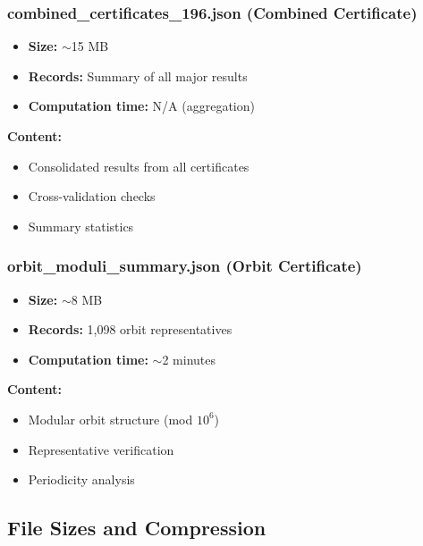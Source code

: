 \documentclass[11pt,a4paper]{article}
\theoremstyle{definition}
\begin{document}
\subsubsection{combined\_certificates\_196.json (Combined Certificate)}

\begin{itemize}[leftmargin=*]
    \item \textbf{Size:} $\sim$15 MB
    \item \textbf{Records:} Summary of all major results
    \item \textbf{Computation time:} N/A (aggregation)
\end{itemize}

\textbf{Content:}
\begin{itemize}
    \item Consolidated results from all certificates
    \item Cross-validation checks
    \item Summary statistics
\end{itemize}

\subsubsection{orbit\_moduli\_summary.json (Orbit Certificate)}

\begin{itemize}[leftmargin=*]
    \item \textbf{Size:} $\sim$8 MB
    \item \textbf{Records:} 1,098 orbit representatives
    \item \textbf{Computation time:} $\sim$2 minutes
\end{itemize}

\textbf{Content:}
\begin{itemize}
    \item Modular orbit structure (mod $10^6$)
    \item Representative verification
    \item Periodicity analysis
\end{itemize}

\subsection{File Sizes and Compression}
\end{document}
